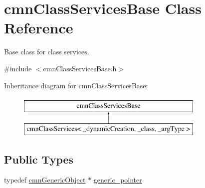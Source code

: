 \hypertarget{classcmn_class_services_base}{}\section{cmn\+Class\+Services\+Base Class Reference}
\label{classcmn_class_services_base}


Base class for class services.  




{\ttfamily \#include $<$cmn\+Class\+Services\+Base.\+h$>$}

Inheritance diagram for cmn\+Class\+Services\+Base\+:\begin{figure}[H]
\begin{center}
\leavevmode
\includegraphics[height=2.000000cm]{de/dd5/classcmn_class_services_base}
\end{center}
\end{figure}
\subsection*{Public Types}
\begin{DoxyCompactItemize}
\item 
typedef \hyperlink{classcmn_generic_object}{cmn\+Generic\+Object} $\ast$ \hyperlink{classcmn_class_services_base_a859cb10b40a79b083c9ba0cae0d52afd}{generic\+\_\+pointer}
\end{DoxyCompactItemize}
